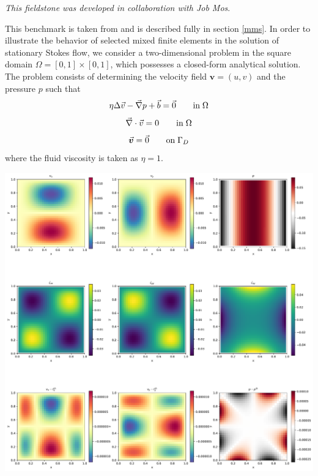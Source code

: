 
{\sl This fieldstone was developed in collaboration with Job Mos}.

This benchmark is taken from \cite{dohu03} and is described fully in section \ref{mms}. 
In order to illustrate the behavior of selected mixed finite elements in the solution 
of stationary Stokes flow,  we consider a two-dimensional problem 
in the square domain $\Omega=[0,1]\times[0,1]$, which possesses a closed-form analytical 
solution. The problem consists of determining the velocity field ${\bm v} = (u,v)$ and the 
pressure $p$ such that 
\[
\eta \Delta \vec{v} - \vec{\nabla} p + \vec{b} = \vec{0}   \quad\quad {\rm in} \; \Omega
\]
\[
\vec{\nabla} \cdot \vec{v} = 0 \quad\quad {\rm in} \; \Omega
\]
\[
\vec{\bm v}=\vec{0} \quad\quad {\rm on} \; \Gamma_D
\]
where the fluid viscosity is taken as $\eta=1$. 



\includegraphics[width=16cm]{python_codes/fieldstone_01/solution.pdf}

